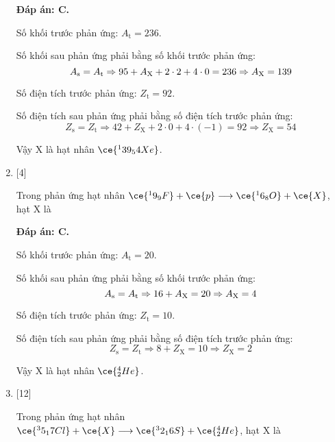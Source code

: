 \begin{enumerate}[label=\bfseries Câu \arabic*:]
	\loigiai
	{		\textbf{Đáp án: C.}
		
		Số khối trước phản ứng: $A_\text{t} = 236$.
		
		Số khối sau phản ứng phải bằng số khối trước phản ứng:
		$$A_\text{s} = A_\text{t} \Rightarrow 95+A_\text X+2\cdot 2 + 4 \cdot 0 = 236 \Rightarrow A_\text X = 139$$
		
		Số điện tích trước phản ứng: $Z_\text{t} = 92$.
		
		Số điện tích sau phản ứng phải bằng số điện tích trước phản ứng:
		$$Z_\text{s} = Z_\text{t} \Rightarrow 42 + Z_\text{X} + 2 \cdot 0 + 4 \cdot(-1) = 92 \Rightarrow Z_\text{X} = 54$$
		
		Vậy X là hạt nhân $\ce{^139_54 Xe}$.
		
	}
	
	\item {} [4]
	\cauhoi
	{Trong phản ứng hạt nhân $\ce{^19_9 F} + \ce{p} \longrightarrow \ce{^16_8 O} + \ce{X}$, hạt X là
	}
	
	\loigiai
	{		\textbf{Đáp án: C.}
		
		Số khối trước phản ứng: $A_\text{t} = 20$.
		
		Số khối sau phản ứng phải bằng số khối trước phản ứng:
		$$A_\text{s} = A_\text{t} \Rightarrow 16+A_\text X = 20 \Rightarrow A_\text X = 4$$
		
		Số điện tích trước phản ứng: $Z_\text{t} = 10$.
		
		Số điện tích sau phản ứng phải bằng số điện tích trước phản ứng:
		$$Z_\text{s} = Z_\text{t} \Rightarrow 8 + Z_\text{X} = 10 \Rightarrow Z_\text{X} = 2$$
		
		Vậy X là hạt nhân $\ce{^4_2 He}$.
		
	}
	
	
	
	\item {} [12]
	\cauhoi
	{Trong phản ứng hạt nhân $\ce{^35_17 Cl} + \ce{X} \longrightarrow \ce{^32_16 S} + \ce{^4_2 He}$, hạt X là
	}
	

\end{enumerate}
